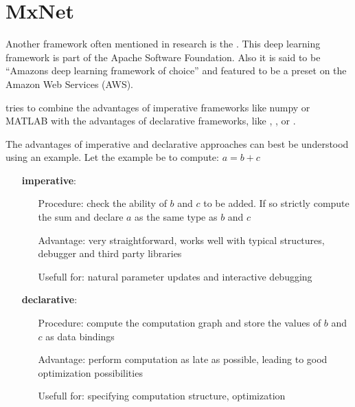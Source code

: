 
\section{MxNet}\label{sec: MxNet}

Another framework often mentioned in research is the \mxnet. This deep learning framework is part of the Apache Software Foundation. Also it is said to be ``Amazons deep learning framework of choice'' \cite{infoworld} and featured to be a preset on the Amazon Web Services (AWS). \cite{chenmxnet}

\mxnet tries to combine the advantages of imperative frameworks like numpy or MATLAB with the advantages of declarative frameworks, like \caffe, \caffetwo, or \tensorflow.

The advantages of imperative and declarative approaches can best be understood using an example.
Let the example be to compute: $a = b+c$
\begin{itemize}
	\item[] \textbf{imperative}:
		\begin{itemize}
			\setlength{\itemindent}{1.5 cm}
			\item[Procedure:] check the ability of $b$ and $c$ to be added. If so strictly compute the sum and declare $a$ as the same type as $b$ and $c$
			\item[Advantage:] very straightforward, works well with typical structures, debugger and third party libraries
			\item[Usefull for:] natural parameter updates and interactive debugging
		\end{itemize}
	\item[] \textbf{declarative}:
		\begin{itemize}
			\setlength{\itemindent}{1.5cm}
			\item[Procedure:] compute the computation graph and store the values of $b$ and $c$ as data bindings
			\item[Advantage:] perform computation as late as possible, leading to good optimization possibilities
			\item[Usefull for:] specifying computation structure, optimization
		\end{itemize}
\end{itemize}

